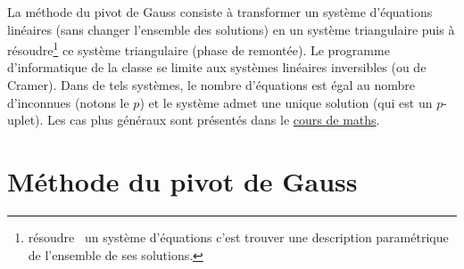

La méthode du pivot de Gauss consiste à transformer un système d'équations linéaires (sans changer l'ensemble des solutions) en un système triangulaire puis à résoudre\footnote{\og résoudre\fg ~ un système d'équations c'est trouver une description paramétrique de l'ensemble de ses solutions.} ce système triangulaire (phase de remontée).\newline
Le programme d'informatique de la classe se limite aux systèmes linéaires inversibles (ou de Cramer). Dans de tels systèmes, le nombre d'équations est égal au nombre d'inconnues (notons le $p$) et le système admet une unique solution (qui est un $p$-uplet). Les cas plus généraux sont présentés dans le \href{http://back.maquisdoc.net/data/cours_nicolair/C2234.pdf}{cours de maths}.
 
\section{Méthode du pivot de Gauss}
